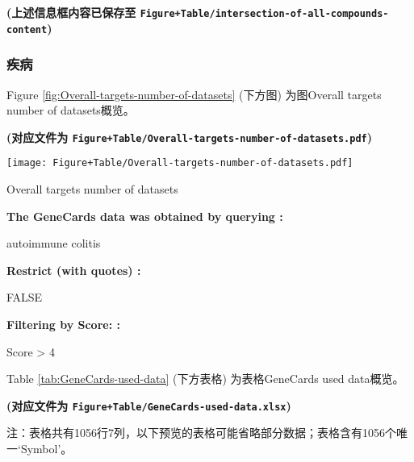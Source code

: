 \documentclass[
]{article}
\begin{document}
\textbf{(上述信息框内容已保存至 \texttt{Figure+Table/intersection-of-all-compounds-content})}

\hypertarget{ux75beux75c5}{%
\subsubsection{疾病}\label{ux75beux75c5}}

Figure \ref{fig:Overall-targets-number-of-datasets} (下方图) 为图Overall targets number of datasets概览。

\textbf{(对应文件为 \texttt{Figure+Table/Overall-targets-number-of-datasets.pdf})}

\def\@captype{figure}
\begin{center}
\texttt{[image: Figure+Table/Overall-targets-number-of-datasets.pdf]}
\caption{Overall targets number of datasets}\label{fig:Overall-targets-number-of-datasets}
\end{center}

\begin{center}\begin{tcolorbox}[colback=gray!10, colframe=gray!50, width=0.9\linewidth, arc=1mm, boxrule=0.5pt]
\textbf{
The GeneCards data was obtained by querying
:}

\vspace{0.5em}

    autoimmune colitis

\vspace{2em}


\textbf{
Restrict (with quotes)
:}

\vspace{0.5em}

    FALSE

\vspace{2em}


\textbf{
Filtering by Score:
:}

\vspace{0.5em}

    Score > 4

\vspace{2em}
\end{tcolorbox}
\end{center}

Table \ref{tab:GeneCards-used-data} (下方表格) 为表格GeneCards used data概览。

\textbf{(对应文件为 \texttt{Figure+Table/GeneCards-used-data.xlsx})}

\begin{center}\begin{tcolorbox}[colback=gray!10, colframe=gray!50, width=0.9\linewidth, arc=1mm, boxrule=0.5pt]注：表格共有1056行7列，以下预览的表格可能省略部分数据；表格含有1056个唯一`Symbol'。
\end{tcolorbox}
\end{center}
\end{document}
